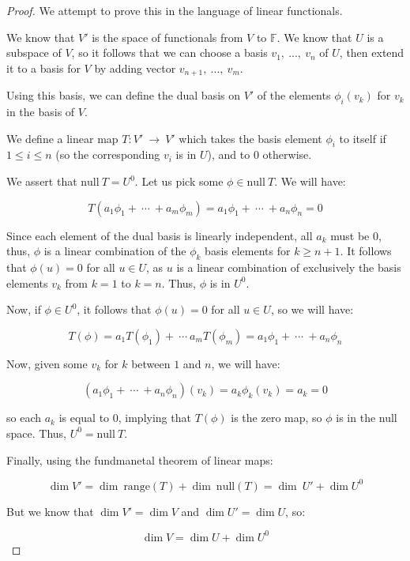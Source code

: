 \documentclass[10pt, oneside]{article}
\begin{document}
    \begin{proof}

      We attempt to prove this in the language of linear functionals.
      \newline

      We know that $V'$ is the space of functionals from $V$ to $\mathbb{F}$. We know that $U$ is a subspace of $V$,
      so it follows that we can choose a basis $v_1, \ ..., \ v_n$ of $U$, then extend it to a basis for $V$ by adding
      vector $v_{n + 1}, \ ..., \ v_m$.
      \newline

      Using this basis, we can define the dual basis on $V'$ of the elements $\phi_{i}(v_k)$ for $v_k$ in the basis of $V$.
      \newline

      We define a linear map $T : V' \ \rightarrow \ V'$ which takes the basis element $\phi_i$ to itself if $1 \leq i \leq n$ (so the
      corresponding $v_i$ is in $U$), and to $0$ otherwise.
      \newline

      We assert that $\text{null} \ T = U^0$. Let us pick some $\phi \in \text{null} \ T$. We will have:

      $$T(a_1 \phi_1 + \ \cdots \ + a_m \phi_m) = a_1 \phi_1 + \ \cdots \ + a_n \phi_n = 0$$

      Since each element of the dual basis is linearly independent, all $a_k$ must be $0$, thus, $\phi$ is a linear combination of the $\phi_k$ basis elements for $k \geq n + 1$.
      It follows that $\phi(u) = 0$ for all $u \in U$, as $u$ is a linear combination of exclusively the basis elements $v_k$ from $k = 1$ to $k = n$. Thus, $\phi$ is in $U^0$.
      \newline

      Now, if $\phi \in U^0$, it follows that $\phi(u) = 0$ for all $u \in U$, so we will have:

      $$T(\phi) = a_1 T(\phi_1) + \ \cdots \ a_m T(\phi_m) = a_1 \phi_1 + \ \cdots \ + a_n \phi_n$$

      Now, given some $v_k$ for $k$ between $1$ and $n$, we will have:

      $$(a_1 \phi_1 + \ \cdots \ + a_n \phi_n)(v_k) = a_k \phi_k(v_k) = a_k = 0$$

      so each $a_k$ is equal to $0$, implying that $T(\phi)$ is the zero map, so $\phi$ is in the null space. Thus, $U^0 = \text{null} \ T$.
      \newline

      Finally, using the fundmanetal theorem of linear maps:

      $$\dim V' = \dim \ \text{range}(T) + \dim \ \text{null}(T) = \dim \ U' + \dim U^0$$

      But we know that $\dim V' = \dim V$ and $\dim U' = \dim U$, so:

      $$\dim V = \dim U + \dim U^0$$

      \end{proof}

    
\end{document}
